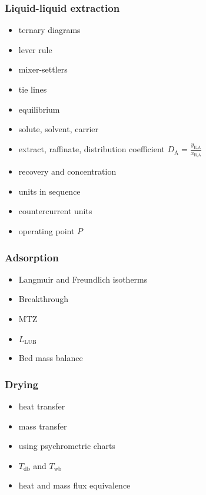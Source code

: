 {
\begin{frame}\frametitle{Liquid-liquid extraction {}}
	{}
	\begin{itemize}
		\item	ternary diagrams
		\item	lever rule
		\item	mixer-settlers
		\item	tie lines
		\item	equilibrium
		\item	solute, solvent, carrier
		\item	extract, raffinate, distribution coefficient $D_\text{A} = \displaystyle \frac{y_\text{E,A}}{x_\text{R,A}}$
		\item	recovery and concentration
		\item	units in sequence
		\item	countercurrent units
		\item	operating point $P$
	\end{itemize}
\end{frame}}

{
\begin{frame}\frametitle{Adsorption {}}
	\begin{itemize}
		\item	Langmuir and Freundlich isotherms
		\item	Breakthrough
		\item	MTZ
		\item	$L_\text{LUB}$
		\item	Bed mass balance
	\end{itemize}
\end{frame}}

{
\begin{frame}\frametitle{Drying {}}
	\begin{itemize}
		\item	heat transfer
		\item	mass transfer
		\item	using psychrometric charts
		\item	$T_\text{db}$ and $T_\text{wb}$
		\item	heat and mass flux equivalence
	\end{itemize}
\end{frame}}

